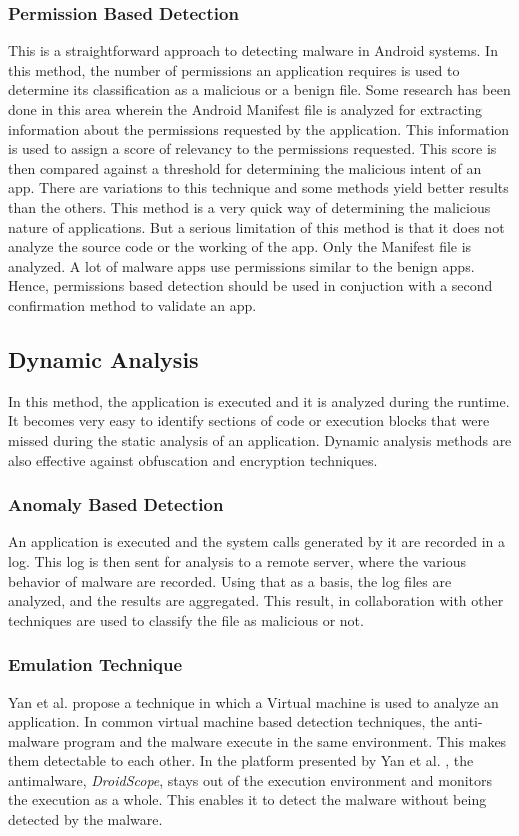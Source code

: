 \subsubsection{Permission Based Detection}
This is a straightforward approach to detecting malware in Android systems. In this method, the number of permissions an application requires is used to determine its classification as a malicious or a benign file. Some research has been done in this area wherein the Android Manifest file is analyzed for extracting information\cite{sato} about the permissions requested by the application. This information is used to assign a score of relevancy to the permissions requested. This score is then compared against a threshold for determining the malicious intent of an app. There are variations to this technique and some methods yield better results than the others. This method is a very quick way of determining the malicious nature of applications. But a serious limitation of this method is that it does not analyze the source code or the working of the app. Only the Manifest file is analyzed. A lot of malware apps use permissions similar to the benign apps. Hence, permissions based detection should be used in conjuction with a second confirmation method to validate an app.
\subsection{Dynamic Analysis}
In this method, the application is executed and it is analyzed during the runtime. It becomes very easy to identify sections of code or execution blocks that were missed during the static analysis of an application. Dynamic analysis methods are also effective against obfuscation and encryption techniques.
\subsubsection{Anomaly Based Detection}
An application is executed and the system calls generated by it are recorded in a log. This log is then sent for analysis to a remote server, where the various behavior of malware are recorded. Using that as a basis, the log files are analyzed, and the results are aggregated. This result, in collaboration with other techniques are used to classify the file as malicious or not.
\subsubsection{Emulation Technique}
Yan et al. \cite{yan} propose a technique in which a Virtual machine is used to analyze an application. In common virtual machine based detection techniques, the anti-malware program and the malware execute in the same environment. This makes them detectable to each other. In the platform presented by Yan et al. \cite{yan}, the antimalware, \emph{DroidScope}, stays out  of the execution environment and monitors the execution as a whole. This enables it to detect the malware without being detected by the malware.
